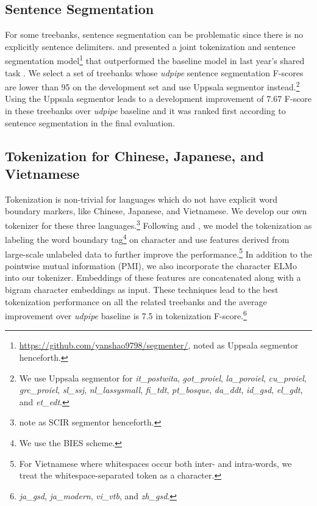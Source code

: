 \documentclass[11pt,a4paper]{article}
\begin{document}
\subsection{Sentence Segmentation}
For some treebanks, sentence segmentation can be problematic
since there is no explicitly sentence delimiters.
\citet{delhoneux-EtAl:2017:K17-3} and \citet{DBLP:journals/corr/abs-1709-03756}
presented a joint tokenization and
sentence segmentation model\footnote{\url{https://github.com/yanshao9798/segmenter/}, noted as Uppsala segmentor henceforth.}
that outperformed the baseline model in last year's shared task \cite{udst:overview2017}.
We select a set of treebanks whose \textit{udpipe} sentence segmentation F-scores
are lower than 95 on the development set and use Uppsala segmentor instead.\footnote{We
	use Uppsala segmentor for \textit{it\_postwita}, \textit{got\_proiel}, \textit{la\_poroiel}, \textit{cu\_proiel},
	\textit{grc\_proiel}, \textit{sl\_ssj}, \textit{nl\_lassysmall}, \textit{fi\_tdt}, \textit{pt\_bosque}, \textit{da\_ddt}, \textit{id\_gsd},
	\textit{el\_gdt}, and \textit{et\_edt}.}
Using the Uppsala segmentor leads to a development improvement of 
7.67 F-score in these treebanks over \textit{udpipe} baseline
and it was ranked first according to sentence segmentation
in the final evaluation.

\subsection{Tokenization for Chinese, Japanese, and Vietnamese}

Tokenization is non-trivial for languages 
which do not have explicit word boundary markers, like Chinese, Japanese, and Vietnamese.
We develop our own tokenizer for these three languages.\footnote{note as SCIR segmentor henceforth.}
Following \citet{che-EtAl:2017:K17-3} and \citet{10.1007/978-3-319-69005-6_6}, we model the tokenization as labeling the
word boundary tag\footnote{We use the BIES scheme.} on character and 
use features derived from large-scale unlabeled data to further improve the performance.\footnote{For Vietnamese where whitespaces occur both inter- and intra-words, we treat the whitespace-separated token as a character.}
In addition to the pointwise mutual information (PMI), we also incorporate
the character ELMo into our tokenizer.
Embeddings of these features are concatenated along with a bigram character embeddings
as input.
These techniques lead to the best tokenization performance on all the related treebanks
and the average improvement over \textit{udpipe} baseline is 7.5 in tokenization F-score.\footnote{\textit{ja\_gsd}, \textit{ja\_modern}, \textit{vi\_vtb}, and \textit{zh\_gsd}.}
\end{document}
